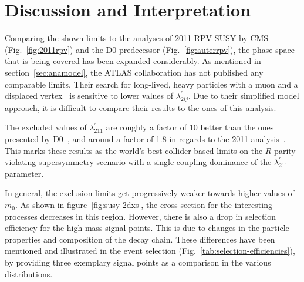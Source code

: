 \section{Discussion and Interpretation}
\label{sec:discussion}

Comparing the shown limits to the analyses of 2011 RPV SUSY by CMS (Fig.~\ref{fig:2011rpv}) and the D0 predecessor (Fig.~\ref{fig:auterrpv}), the phase space that is being covered has been expanded considerably. As mentioned in section~\ref{sec:anamodel}, the ATLAS collaboration has not published any comparable limits. Their search for long-lived, heavy particles with a muon and a displaced vertex~\cite{atlasrpv} is sensitive to lower values of $\lambda^\prime_{2ij}$. Due to their simplified model approach, it is difficult to compare their results to the ones of this analysis.

The excluded values of $\lambda^{\prime}_{211}$ are roughly a factor of 10 better than the ones presented by D0~\cite{auter,d0rpv}, and around a factor of 1.8 in regards to the 2011 analysis~\cite{2011rpv}. This marks these results as the world's best collider-based limits on the $R$-parity violating supersymmetry scenario with a single coupling dominance of the $\lambda^{\prime}_{211}$ parameter.

In general, the exclusion limits get progressively weaker towards higher values of $m_0$. As shown in figure~\ref{fig:susy-2dxs}, the cross section for the interesting processes decreases in this region. However, there is also a drop in selection efficiency for the high mass signal points. This is due to changes in the particle properties and composition of the decay chain. These differences have been mentioned and illustrated in the event selection (Fig.~\ref{tab:selection-efficiencies}), by providing three exemplary signal points as a comparison in the various distributions.

